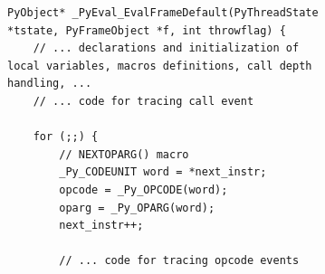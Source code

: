 \begin{figure}[H]
    \centering
    \begin{subfigure}[b]{0.65\textwidth}
        \centering
        \begin{verbatim}
PyObject* _PyEval_EvalFrameDefault(PyThreadState *tstate, PyFrameObject *f, int throwflag) {
    // ... declarations and initialization of local variables, macros definitions, call depth handling, ...
    // ... code for tracing call event

    for (;;) {
        // NEXTOPARG() macro
        _Py_CODEUNIT word = *next_instr;
        opcode = _Py_OPCODE(word);
        oparg = _Py_OPARG(word);
        next_instr++;

        // ... code for tracing opcode events


\end{verbatim}
\end{subfigure}
\end{figure}
